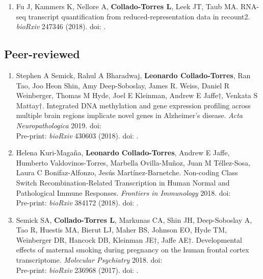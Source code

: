 \begin{enumerate}
        \item Fu J, Kammers K, Nellore A, \textbf{Collado-Torres L}, Leek JT, Taub MA. RNA-seq transcript quantification from reduced-representation data in recount2. \emph{bioRxiv} 247346 (2018). doi: .
    \end{enumerate}

\subsection{Peer-reviewed}
    \begin{enumerate}
        
        \item Stephen A Semick, Rahul A Bharadwaj, \textbf{Leonardo Collado-Torres}, Ran Tao, Joo Heon Shin, Amy Deep-Soboslay, James R. Weiss, Daniel R Weinberger, Thomas M Hyde, Joel E Kleinman, Andrew E Jaffe$\dagger$, Venkata S Mattay$\dagger$. Integrated DNA methylation and gene expression profiling across multiple brain regions implicate novel genes in Alzheimer’s disease. \emph{Acta Neuropathologica} 2019. doi: 
        \\ Pre-print: \emph{bioRxiv} 430603 (2018). doi: .
            
        \item Helena Kuri-Magaña, \textbf{Leonardo Collado-Torres}, Andrew E Jaffe, Humberto Valdovinos-Torres, Marbella Ovilla-Muñoz, Juan M Téllez-Sosa, Laura C Bonifaz-Alfonzo, Jesús Martínez-Barnetche. Non-coding Class Switch Recombination-Related Transcription in Human Normal and Pathological Immune Responses. \emph{Frontiers in Immunology} 2018. doi: 
        \\ Pre-print: \emph{bioRxiv} 384172 (2018). doi: .
        
        \item Semick SA, \textbf{Collado-Torres L}, Markunas CA, Shin JH, Deep-Soboslay A, Tao R, Huestis MA, Bierut LJ, Maher BS, Johnson EO, Hyde TM, Weinberger DR, Hancock DB, Kleinman JE$\dagger$, Jaffe AE$\dagger$. Developmental effects of maternal smoking during pregnancy on the human frontal cortex transcriptome. \emph{Molecular Psychiatry} 2018. doi: 
        \\ Pre-print: \emph{bioRxiv} 236968 (2017). doi: .
        

\end{enumerate}
